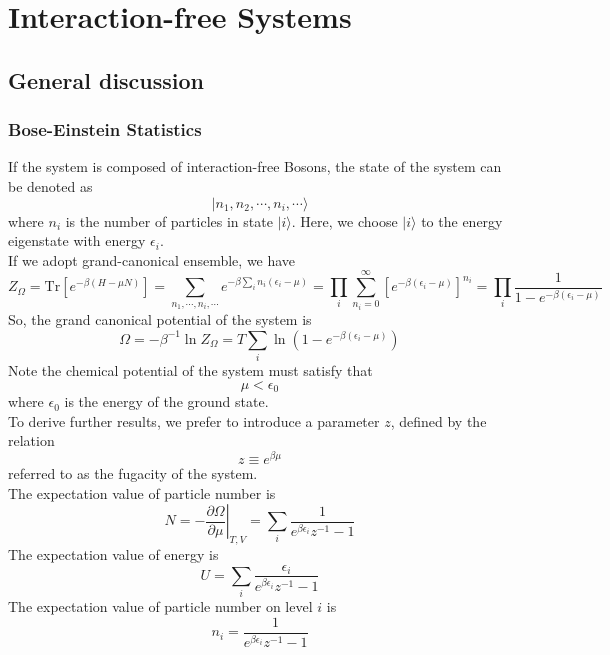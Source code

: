\chapter{Interaction-free Systems}
\section{General discussion}
\subsection{Bose-Einstein Statistics}
If the system is composed of interaction-free Bosons, the state of the system can be denoted as
\[|n_1,n_2,\cdots,n_i,\cdots\rangle\]
where $n_i$ is the number of particles in state $|i\rangle$. Here, we choose $|i\rangle$ to the energy eigenstate with energy $\epsilon_i$. 
\\
If we adopt grand-canonical ensemble, we have
\[Z_{\Omega} = \mathrm{Tr}[e^{-\beta(H-\mu N)}] = \sum_{n_1,\cdots,n_i,\cdots} e^{-\beta \sum_{i}n_i(\epsilon_i-\mu)} = \prod_{i}\sum_{n_i=0}^{\infty}[e^{-\beta(\epsilon_i-\mu)}]^{n_i} = \prod_{i} \frac{1}{1-e^{-\beta(\epsilon_i - \mu)}}\]
So, the grand canonical potential of the system is
\[\Omega = -\beta^{-1}\ln Z_{\Omega} = T \sum_i \ln (1 - e^{-\beta(\epsilon_i - \mu)})\]
Note the chemical potential of the system must satisfy that
\[\mu < \epsilon_0\] where $\epsilon_0$ is the energy of the ground state.
\\
To derive further results, we prefer to introduce a parameter $z$, defined by the relation
\[z  \equiv e^{\beta \mu}\] referred to as the fugacity of the system.
\\
The expectation value of particle number is
\[N = - \left. \frac{\partial \Omega}{\partial \mu} \right|_{T,V} = \sum_i \frac{1}{e^{\beta \epsilon_i}z^{-1}-1}\]
The expectation value of energy is
\[U = \sum_i \frac{\epsilon_i}{e^{\beta \epsilon_i}z^{-1}-1}\]
The expectation value of particle number on level $i$ is
\[n_i =  \frac{1}{e^{\beta \epsilon_i}z^{-1}-1}\]

